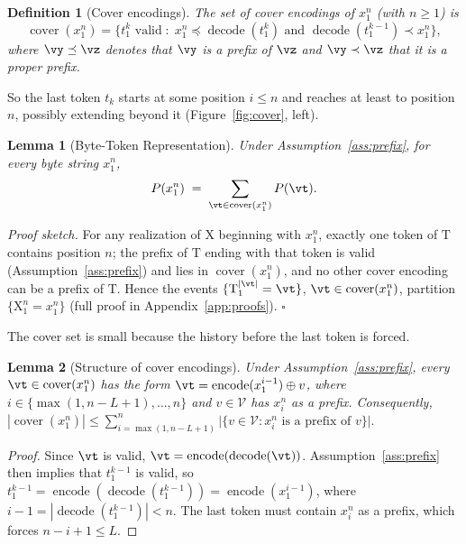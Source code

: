 \documentclass{article} %
\newtheorem{definition}{Definition}
\newtheorem{lemma}{Lemma}
\newcommand{\enc}{\operatorname{encode}}
\newcommand{\dec}{\operatorname{decode}}
\newcommand{\cover}{\operatorname{cover}}
\newcommand{\vocab}{\mathcal{V}}
\providecommand{\rX}{\mathrm{X}}
\providecommand{\rT}{\mathrm{T}}
\begin{document}
\begin{definition}[Cover encodings]
\label{def:cover}
The set of \emph{cover encodings} of $x_1^n$ (with $n \geq 1$) is
\begin{equation*}
\cover(x_1^n) = \big\{ t_1^k \text{ valid} \;:\; x_1^n \preceq \dec(t_1^k) \text{ and } \dec(t_1^{k-1}) \prec x_1^n \big\},
\end{equation*}
where $\vy \preceq \vz$ denotes that $\vy$ is a prefix of $\vz$ and $\vy \prec \vz$ that it is a proper prefix.
\end{definition}

So the last token $t_k$ starts at some position $i \le n$ and reaches at least to position $n$, possibly extending beyond it (Figure~\ref{fig:cover}, left).

\begin{lemma}[Byte-Token Representation]
\label{lem:representation}
Under Assumption~\ref{ass:prefix}, for every byte string $x_1^n$,
\begin{equation}
P(x_1^n) \;=\; \sum_{\vt \in \cover(x_1^n)} P(\vt).
\label{eq:representation}
\end{equation}
\end{lemma}

\emph{Proof sketch.} For any realization of $\rX$ beginning with $x_1^n$, exactly one token of $\rT$ contains position $n$; the prefix of $\rT$ ending with that token is valid (Assumption~\ref{ass:prefix}) and lies in $\cover(x_1^n)$, and no other cover encoding can be a prefix of $\rT$. Hence the events $\{\rT_1^{|\vt|}=\vt\}$, $\vt \in \cover(x_1^n)$, partition $\{\rX_1^n = x_1^n\}$ (full proof in Appendix~\ref{app:proofs}). \hfill$\square$

The cover set is small because the history before the last token is forced.

\begin{lemma}[Structure of cover encodings]
\label{lem:structure}
Under Assumption~\ref{ass:prefix}, every $\vt \in \cover(x_1^n)$ has the form $\vt = \enc(x_1^{i-1}) \oplus v$, where $i\in\{\max(1, n-L+1), \dots, n\}$ and $v \in \vocab$ has $x_i^n$ as a prefix. Consequently,
$|\cover(x_1^n)| \le \sum_{i=\max(1,n-L+1)}^{n} \big|\{v\in\vocab : x_i^n \text{ is a prefix of } v\}\big|.$
\end{lemma}
\begin{proof}
Since $\vt$ is valid, $\vt = \enc(\dec(\vt))$. Assumption~\ref{ass:prefix} then implies that $t_1^{k-1}$ is valid, so $t_1^{k-1} = \enc(\dec(t_1^{k-1})) = \enc(x_1^{i-1})$, where $i-1 = |\dec(t_1^{k-1})| < n$. The last token must contain $x_i^n$ as a prefix, which forces $n - i + 1 \le L$.
\end{proof}
\end{document}
